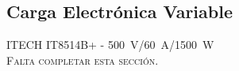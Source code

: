 \subsection{Carga Electrónica Variable}

{\Medium ITECH IT8514B+} - \SI[]{500}[]{\volt}/\SI[]{60}[]{\ampere}/\SI[]{1500}[]{\watt}\\

{\Bold\scshape Falta completar esta sección.}\\

\lipsum[1]\\

\lipsum[2]\\

\lipsum[3]\\